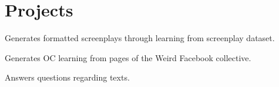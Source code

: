 \documentclass[]{hieudo-build}
\begin{document}
\begin{minipage}[t]{0.3\textwidth}


\section{Projects}
\normalsize Generates formatted screenplays through learning from screenplay dataset. \\
\sectionsep

\normalsize Generates OC learning from pages of the Weird Facebook collective. \\
\sectionsep 

\normalsize Answers questions regarding texts. \\
\sectionsep

\begin{flushright}
\end{flushright}

\end{minipage} 
\hfill


\end{document}
